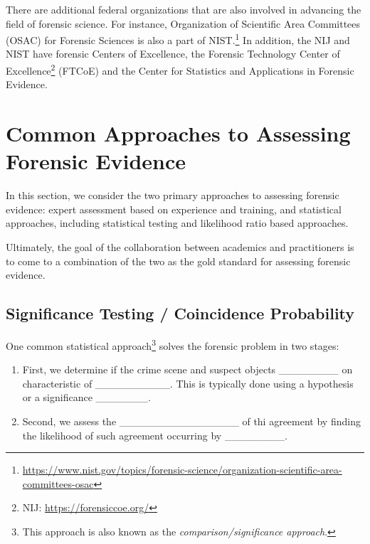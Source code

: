 \documentclass[]{book}
\providecommand{\tightlist}{%
  \setlength{\itemsep}{0pt}\setlength{\parskip}{0pt}}
\let\rmarkdownfootnote\footnote%
\def\footnote{\protect\rmarkdownfootnote}
\theoremstyle{definition}
\theoremstyle{definition}
\theoremstyle{remark}
\begin{document}
There are additional federal organizations that are also involved in
advancing the field of forensic science. For instance, Organization of
Scientific Area Committees (OSAC) for Forensic Sciences is also a part
of NIST.\footnote{\url{https://www.nist.gov/topics/forensic-science/organization-scientific-area-committees-osac}}
In addition, the NIJ and NIST have forensic Centers of Excellence, the
Forensic Technology Center of Excellence\footnote{NIJ:
  \url{https://forensiccoe.org/}} (FTCoE) and the Center for Statistics
and Applications in Forensic Evidence.

\section{Common Approaches to Assessing Forensic
Evidence}\label{common-approaches-to-assessing-forensic-evidence}

In this section, we consider the two primary approaches to assessing
forensic evidence: expert assessment based on experience and training,
and statistical approaches, including statistical testing and likelihood
ratio based approaches.

Ultimately, the goal of the collaboration between academics and
practitioners is to come to a combination of the two as the gold
standard for assessing forensic evidence.

\subsection{Significance Testing / Coincidence
Probability}\label{significance-testing-coincidence-probability}

One common statistical approach\footnote{This approach is also known as
  the \emph{comparison/significance approach}.} solves the forensic
problem in two stages:

\begin{enumerate}
\def\labelenumi{\arabic{enumi}.}
\tightlist
\item
  First, we determine if the crime scene and suspect objects
  \_\_\_\_\_\_\_\_ on characteristic of \_\_\_\_\_\_\_\_\_\_. This is
  typically done using a hypothesis or a significance \_\_\_\_\_\_\_.
  \vspace{.1in}
\item
  Second, we assess the \_\_\_\_\_\_\_\_\_\_\_\_\_\_\_\_ of thi
  agreement by finding the likelihood of such agreement occurring by
  \_\_\_\_\_\_\_\_.
\end{enumerate}
\end{document}
